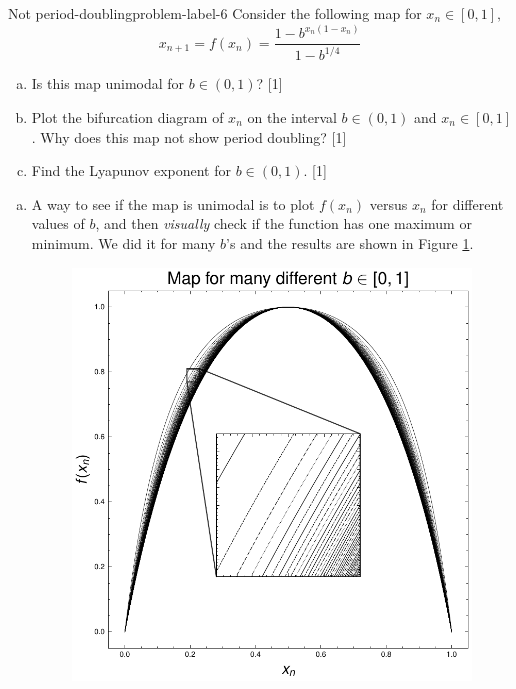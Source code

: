 \begin{problem}{Not period-doubling}{problem-label-6}
Consider the following map for $x_n \in [0,1],$
\[
    x_{n+1} = f(x_n) = \frac{1-b^{x_n(1-x_n)}}{1-b^{1/4}}
\]
\begin{enumerate}[(a)]
    \item Is this map unimodal for $b \in (0,1)$? [1]
    \item Plot the bifurcation diagram of $x_n$ on the interval $b \in (0,1)$ and $x_n \in [0,1]$.
    Why does this map not show period doubling? [1]
    \item Find the Lyapunov exponent for $b \in (0,1)$. [1]
\end{enumerate}
\end{problem}

\begin{enumerate}[(a)]
    \item A way to see if the map is unimodal is to plot $f(x_n)$ versus $x_n$ for different values
    of $b$, and then \textit{visually} check if the function has one maximum or minimum. We did it
    for many $b$'s and the results are shown in Figure \ref{fig:3a}.
    \begin{figure}[!ht]
        \centering
        \includegraphics[scale=0.65]{images/unimodal.pdf}
        \label{fig:3a}
    \end{figure}


\end{enumerate}
